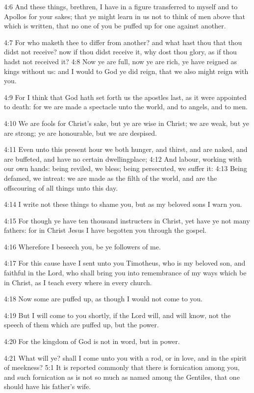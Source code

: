 4:6 And these things, brethren, I have in a figure transferred to
myself and to Apollos for your sakes; that ye might learn in us not to
think of men above that which is written, that no one of you be puffed
up for one against another.

4:7 For who maketh thee to differ from another? and what hast thou
that thou didst not receive? now if thou didst receive it, why dost
thou glory, as if thou hadst not received it?  4:8 Now ye are full,
now ye are rich, ye have reigned as kings without us: and I would to
God ye did reign, that we also might reign with you.

4:9 For I think that God hath set forth us the apostles last, as it
were appointed to death: for we are made a spectacle unto the world,
and to angels, and to men.

4:10 We are fools for Christ's sake, but ye are wise in Christ; we are
weak, but ye are strong; ye are honourable, but we are despised.

4:11 Even unto this present hour we both hunger, and thirst, and are
naked, and are buffeted, and have no certain dwellingplace; 4:12 And
labour, working with our own hands: being reviled, we bless; being
persecuted, we suffer it: 4:13 Being defamed, we intreat: we are made
as the filth of the world, and are the offscouring of all things unto
this day.

4:14 I write not these things to shame you, but as my beloved sons I
warn you.

4:15 For though ye have ten thousand instructers in Christ, yet have
ye not many fathers: for in Christ Jesus I have begotten you through
the gospel.

4:16 Wherefore I beseech you, be ye followers of me.

4:17 For this cause have I sent unto you Timotheus, who is my beloved
son, and faithful in the Lord, who shall bring you into remembrance of
my ways which be in Christ, as I teach every where in every church.

4:18 Now some are puffed up, as though I would not come to you.

4:19 But I will come to you shortly, if the Lord will, and will know,
not the speech of them which are puffed up, but the power.

4:20 For the kingdom of God is not in word, but in power.

4:21 What will ye? shall I come unto you with a rod, or in love, and
in the spirit of meekness?  5:1 It is reported commonly that there is
fornication among you, and such fornication as is not so much as named
among the Gentiles, that one should have his father's wife.

